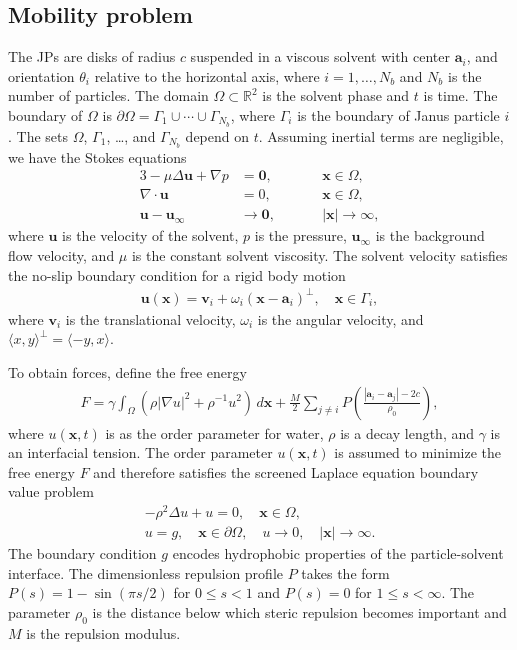 \documentclass[prb,preprint,showpacs,preprintnumbers,amsmath,amssymb,longbibliography]{revtex4-1}
\renewcommand{\aa}{\mathbf{a}}
\newcommand{\bd}{\partial}
\newcommand{\xx}{\mathbf{x}}
\newcommand{\uu}{\mathbf{u}}
\renewcommand{\vv}{\mathbf{v}}
\begin{document}
\subsection{Mobility problem}
The JPs are disks of radius $c$ suspended in a viscous solvent
with center $\aa_i$, and orientation $\theta_i$
relative to the horizontal axis, where $i = 1, \ldots, N_b$ and $N_b$ is
the number of particles. The domain $\Omega \subset \mathbb{R}^2$ is
the solvent phase and $t$ is time. The boundary of $\Omega$ is
$\bd\Omega = \Gamma_1 \cup \cdots \cup \Gamma_{N_b}$, where $\Gamma_i$
is the boundary of Janus particle $i$.
The sets $\Omega$, $\Gamma_1$, \dots, and $\Gamma_{N_b}$ depend on $t$.
Assuming inertial terms are negligible, we have the Stokes equations
\begin{alignat}{3}
\label{eq:stokes}
  -\mu \Delta \uu + \nabla p &= \mathbf{0}, && \xx \in \Omega, \\
\label{eq:stokesMass}
  \nabla\cdot \uu &= 0, \qquad && \xx \in \Omega, \\
\label{eq:stokesFarfield}
  \uu - \uu_\infty &\to \mathbf{0}, && |\xx| \to \infty,
\end{alignat}
where $\uu$ is the velocity of the solvent, $p$ is the pressure,
$\uu_\infty$ is the background flow velocity, and $\mu$ is the constant
solvent viscosity. The solvent velocity satisfies the no-slip boundary
condition for a rigid body motion
\begin{align}
  \label{eq:rigid-vel}
  \uu(\xx) = \vv_i + \omega_i (\xx - \aa_i)^\perp, 
    \quad \xx \in \Gamma_i,
\end{align}
where $\vv_i$ is the translational velocity, $\omega_i$ is the angular
velocity, and $\langle x, y \rangle^{\perp} = \langle -y, x\rangle$. 

To obtain forces, define the free
energy~\cite{Fu20, Fu2022_JFM}
\begin{align}
\label{eq:free_energy}
F = \gamma
  \int_{\Omega} \left(\rho |\nabla u|^2 + \rho^{-1} u^2 \right)
\,d\xx
+ \frac{M}{2}
\sum_{j \neq i} 
P\left(\frac{|\aa_i - \aa_j|-2c}{\rho_0}\right),
\end{align}
where $u(\xx,t)$ is as the order parameter for water\cite{Ma77, GoHaKo94},
$\rho$ is a decay length, and $\gamma$ is an interfacial tension. 
The order parameter $u(\xx,t)$ is assumed to minimize the free energy
$F$ and therefore satisfies the screened Laplace equation
boundary value problem
\begin{gather}
  \label{eq:SL}
  -\rho^2 \Delta u + u = 0,\quad \xx \in \Omega, \\
  \label{eq:SLbc}
  u = g, \quad \xx \in \bd\Omega, \quad 
  u \rightarrow 0, \quad |\xx| \rightarrow \infty.
\end{gather}
The boundary condition $g$ encodes hydrophobic properties of the
particle-solvent interface.
The dimensionless repulsion profile $P$ takes the form $P(s) = 1 -
\sin(\pi s/2)$ for $0 \leq s < 1$ and $P(s) = 0$ for $1 \leq s <
\infty$. The parameter $\rho_0$ is the distance 
below which steric repulsion becomes important and 
$M$ is the repulsion modulus.
\end{document}
